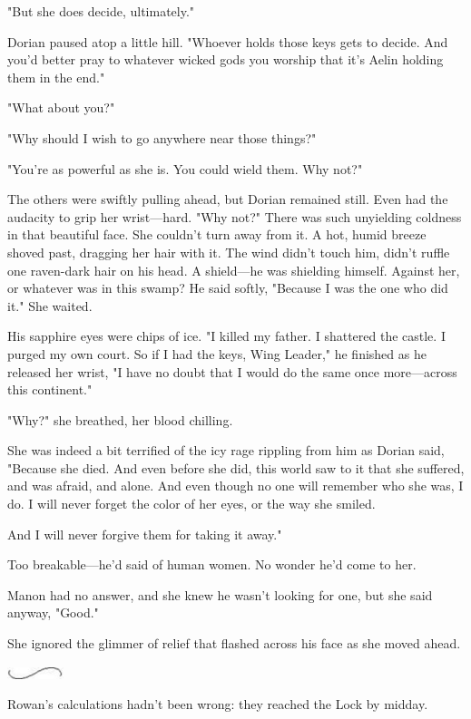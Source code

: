 "But she does decide, ultimately."

Dorian paused atop a little hill. "Whoever holds those keys gets to decide. And you'd better pray to whatever wicked gods you worship that it's Aelin holding them in the end."

"What about you?"

"Why should I wish to go anywhere near those things?"

"You're as powerful as she is. You could wield them. Why not?"

The others were swiftly pulling ahead, but Dorian remained still. Even had the audacity to grip her wrist---hard. "Why not?" There was such unyielding coldness in that beautiful face. She couldn't turn away from it. A hot, humid breeze shoved past, dragging her hair with it. The wind didn't touch him, didn't ruffle one raven-dark hair on his head. A shield---he was shielding himself. Against her, or whatever was in this swamp? He said softly, "Because I was the one who did it." She waited.

His sapphire eyes were chips of ice. "I killed my father. I shattered the castle. I purged my own court. So if I had the keys, Wing Leader," he finished as he released her wrist, "I have no doubt that I would do the same once more---across this continent."

"Why?" she breathed, her blood chilling.

She was indeed a bit terrified of the icy rage rippling from him as Dorian said, "Because she died. And even before she did, this world saw to it that she suffered, and was afraid, and alone. And even though no one will remember who she was, I do. I will never forget the color of her eyes, or the way she smiled.

And I will never forgive them for taking it away."

Too breakable---he'd said of human women. No wonder he'd come to her.

Manon had no answer, and she knew he wasn't looking for one, but she said anyway, "Good."

She ignored the glimmer of relief that flashed across his face as she moved ahead.

\includegraphics[width=0.65in,height=0.13in]{images/seperator}

Rowan's calculations hadn't been wrong: they reached the Lock by midday.

